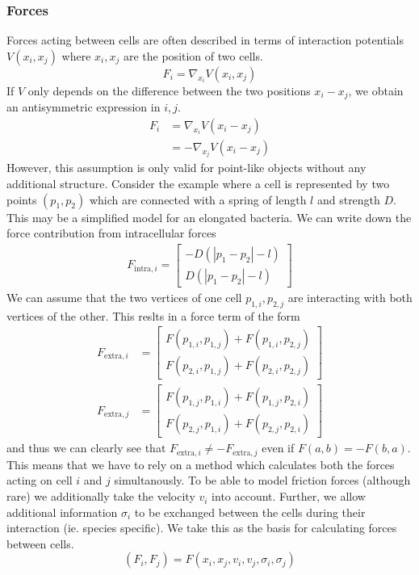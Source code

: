 \documentclass{article}
\begin{document}
\subsubsection{Forces}
\label{subsec:abstractions-cell-cell-forces}
Forces acting between cells are often described in terms of interaction potentials $V(x_i, x_j)$
where $x_i,x_j$ are the position of two cells.
\begin{equation}
    F_i = \nabla_{x_i}V(x_i, x_j)
\end{equation}
If $V$ only depends on the difference between the two positions $x_i-x_j$, we obtain an
antisymmetric expression in $i,j$.
\begin{align}
    F_i &= \nabla_{x_i}V(x_i-x_j)\\
    &= -\nabla_{x_j}V(x_i-x_j)
\end{align}
However, this assumption is only valid for point-like objects without any additional structure.
Consider the example where a cell is represented by two points $(p_1, p_2)$ which are connected with
a spring of length $l$ and strength $D$.
This may be a simplified model for an elongated bacteria.
We can write down the force contribution from intracellular forces
\begin{align}
    F_{\text{intra},i} = \begin{bmatrix}
        - D (|p_1-p_2|-l)\\
        D (|p_1-p_2|-l)
    \end{bmatrix}
\end{align}
We can assume that the two vertices of one cell $p_{1,i},p_{2,j}$ are interacting with both vertices
of the other.
This reslts in a force term of the form
\begin{align}
    F_{\text{extra},i} &= \begin{bmatrix}
        F(p_{1,i}, p_{1,j}) + F(p_{1,i}, p_{2,j})\\
        F(p_{2,i}, p_{1,j}) + F(p_{2,i}, p_{2,j})
    \end{bmatrix}\\
    F_{\text{extra},j} &= \begin{bmatrix}
        F(p_{1,j}, p_{1,i}) + F(p_{1,j}, p_{2,i})\\
        F(p_{2,j}, p_{1,i}) + F(p_{2,j}, p_{2,i})
    \end{bmatrix}
\end{align}
and thus we can clearly see that $F_{\text{extra},i}\neq - F_{\text{extra},j}$ even if
$F(a,b)=-F(b,a)$.
This means that we have to rely on a method which calculates both the forces acting on cell $i$ and
$j$ simultanously.
To be able to model friction forces (although rare) we additionally take the velocity $v_i$ into
account.
Further, we allow additional information $\sigma_i$ to be exchanged between the cells during their
interaction (ie. species specific).
We take this as the basis for calculating forces between cells.
\begin{equation}
    (F_i, F_j) = F(x_i, x_j, v_i, v_j, \sigma_i, \sigma_j)
\end{equation}
\end{document}
